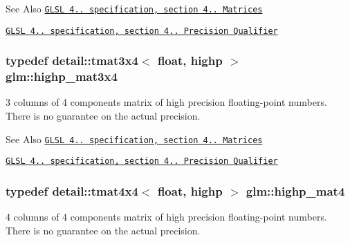 \begin{DoxySeeAlso}{See Also}
\href{http://www.opengl.org/registry/doc/GLSLangSpec.4.20.8.pdf}{\tt G\-L\-S\-L 4.. specification, section 4.. Matrices} 

\href{http://www.opengl.org/registry/doc/GLSLangSpec.4.20.8.pdf}{\tt G\-L\-S\-L 4.. specification, section 4.. Precision Qualifier} 
\end{DoxySeeAlso}
\hypertarget{group__core__precision_gabaf9c8dd35db715b1093042703f879d0}{
\subsubsection[{highp\-\_\-mat3x4}]{\setlength{\rightskip}{0pt plus 5cm}typedef detail\-::tmat3x4$<$ float, highp $>$ {\bf glm\-::highp\-\_\-mat3x4}}}\label{group__core__precision_gabaf9c8dd35db715b1093042703f879d0}
3 columns of 4 components matrix of high precision floating-\/point numbers. There is no guarantee on the actual precision.

\begin{DoxySeeAlso}{See Also}
\href{http://www.opengl.org/registry/doc/GLSLangSpec.4.20.8.pdf}{\tt G\-L\-S\-L 4.. specification, section 4.. Matrices} 

\href{http://www.opengl.org/registry/doc/GLSLangSpec.4.20.8.pdf}{\tt G\-L\-S\-L 4.. specification, section 4.. Precision Qualifier} 
\end{DoxySeeAlso}
\hypertarget{group__core__precision_ga3067b3b8ce793227a51b2e3c233257d5}{
\subsubsection[{highp\-\_\-mat4}]{\setlength{\rightskip}{0pt plus 5cm}typedef detail\-::tmat4x4$<$ float, highp $>$ {\bf glm\-::highp\-\_\-mat4}}}\label{group__core__precision_ga3067b3b8ce793227a51b2e3c233257d5}
4 columns of 4 components matrix of high precision floating-\/point numbers. There is no guarantee on the actual precision.

